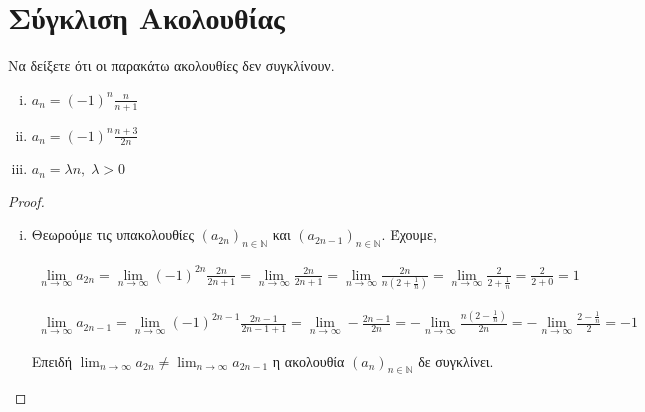 \documentclass[a4paper,table]{report}
\begin{document}
\begin{center}
  \minibox[c]{\large \bfseries \textcolor{Col1}{Ακολουθίες} \\ \large
  \textcolor{Col1}{Ασκήσεις}}
\end{center}

\vspace{\baselineskip}


\setcounter{chapter}{1}

\section*{Σύγκλιση Ακολουθίας}

\begin{enumerate}
  \item Να δείξετε ότι οι παρακάτω ακολουθίες δεν συγκλίνουν.
    \begin{enumerate}[i)]
      \item $ a_{n} = (-1)^{n} \frac{n}{n+1} $ 
      \item $ a_{n} = (-1)^{n} \frac{n+3}{2n} $ 
      \item $ a_{n} = \lambda n, \; \lambda > 0 $ 
    \end{enumerate}
    \begin{proof}
    \item {}
      \begin{enumerate}[i)]
        \item Θεωρούμε τις υπακολουθίες $(a_{2n})_{n \in \mathbb{N}} $ 
          και $(a_{2n-1})_{n \in \mathbb{N}} $. Έχουμε,

          \begin{align*} 
            \lim_{n \to \infty} a_{2n} = \lim_{n \to \infty}  (-1)^{2n} 
            \frac{2n}{2n+1} = \lim_{n \to \infty}  \frac{2n}{2n+1} = 
            \lim_{n \to \infty} \frac{2n}{n(2 + \frac{1}{n})} = 
            \lim_{n \to \infty} \frac{2}{2 + \frac{1}{n}} = 
            \frac{2}{2+0} = 1 
          \end{align*}

          \begin{align*} 
            \lim_{n \to \infty} a_{2n-1} = \lim_{n \to \infty} 
            (-1)^{2n-1} \frac{2n-1}{2n-1 + 1} = \lim_{n \to \infty} - 
            \frac{2n-1}{2n} = -\lim_{n \to \infty} 
            \frac{n (2 - \frac{1}{n})}{2n} = - \lim_{n \to \infty} 
            \frac{2 - \frac{1}{n} }{2} = -1 
          \end{align*}

          Επειδή $ \lim_{n \to \infty} a_{2n} \neq \lim_{n \to \infty} a_{2n-1} $
          η ακολουθία $ (a_{n})_{n \in \mathbb{N}} $ δε συγκλίνει.


\end{enumerate}
\end{proof}
\end{enumerate}
\end{document}

